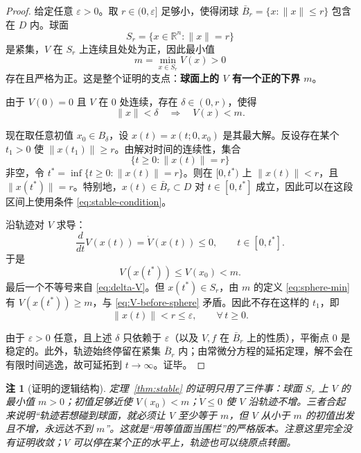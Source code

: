 \documentclass[11pt, a4paper, UTF8, fontset=none]{ctexart}
\theoremstyle{cnthm}
\newtheorem{remark}{注}[section]
\newcommand{\R}{\mathbb{R}}
\newcommand{\norm}[1]{\lVert #1\rVert}
\begin{document}
\begin{proof}
给定任意 $\varepsilon>0$。取 $r\in(0,\varepsilon]$ 足够小，使得闭球 $\bar B_r=\{x:\norm{x}\le r\}$ 包含在 $D$ 内。球面
\begin{equation}
  S_r=\{x\in\R^n:\norm{x}=r\}
\end{equation}
是紧集，$V$ 在 $S_r$ 上连续且处处为正，因此最小值
\begin{equation}
  m=\min_{x\in S_r}V(x)>0
  \label{eq:sphere-min}
\end{equation}
存在且严格为正。这是整个证明的支点：\textbf{球面上的 $V$ 有一个正的下界 $m$}。

由于 $V(0)=0$ 且 $V$ 在 $0$ 处连续，存在 $\delta\in(0,r)$，使得
\begin{equation}
  \norm{x}<\delta\quad\Longrightarrow\quad V(x)<m.
  \label{eq:delta-V}
\end{equation}

现在取任意初值 $x_0\in B_\delta$，设 $x(t)=x(t;0,x_0)$ 是其最大解。反设存在某个 $t_1>0$ 使 $\norm{x(t_1)}\ge r$。由解对时间的连续性，集合
\begin{equation}
  \{t\ge0:\norm{x(t)}=r\}
\end{equation}
非空，令 $t^\ast=\inf\{t\ge0:\norm{x(t)}=r\}$。则在 $[0,t^\ast)$ 上 $\norm{x(t)}<r$，且 $\norm{x(t^\ast)}=r$。特别地，$x(t)\in\bar B_r\subset D$ 对 $t\in[0,t^\ast]$ 成立，因此可以在这段区间上使用条件 \eqref{eq:stable-condition}。

沿轨迹对 $V$ 求导：
\begin{equation}
  \frac{d}{dt}V(x(t))=\dot V(x(t))\le0,\qquad t\in[0,t^\ast].
\end{equation}
于是
\begin{equation}
  V(x(t^\ast))\le V(x_0)<m.
  \label{eq:V-before-sphere}
\end{equation}
最后一个不等号来自 \eqref{eq:delta-V}。但 $x(t^\ast)\in S_r$，由 $m$ 的定义 \eqref{eq:sphere-min} 有 $V(x(t^\ast))\ge m$，与 \eqref{eq:V-before-sphere} 矛盾。因此不存在这样的 $t_1$，即
\begin{equation}
  \norm{x(t)}<r\le\varepsilon,\qquad \forall\,t\ge0.
\end{equation}

由于 $\varepsilon>0$ 任意，且上述 $\delta$ 只依赖于 $\varepsilon$（以及 $V,f$ 在 $\bar B_r$ 上的性质），平衡点 $0$ 是稳定的。此外，轨迹始终停留在紧集 $\bar B_r$ 内；由常微分方程的延拓定理，解不会在有限时间逃逸，故可延拓到 $t\to\infty$。证毕。
\end{proof}

\begin{remark}[证明的逻辑结构]
定理~\ref{thm:stable} 的证明只用了三件事：球面 $S_r$ 上 $V$ 的最小值 $m>0$；初值足够近使 $V(x_0)<m$；$\dot V\le0$ 使 $V$ 沿轨迹不增。三者合起来说明“轨迹若想碰到球面，就必须让 $V$ 至少等于 $m$，但 $V$ 从小于 $m$ 的初值出发且不增，永远达不到 $m$”。这就是“用等值面当围栏”的严格版本。注意这里完全没有证明收敛；$V$ 可以停在某个正的水平上，轨迹也可以绕原点转圈。
\end{remark}
\end{document}
